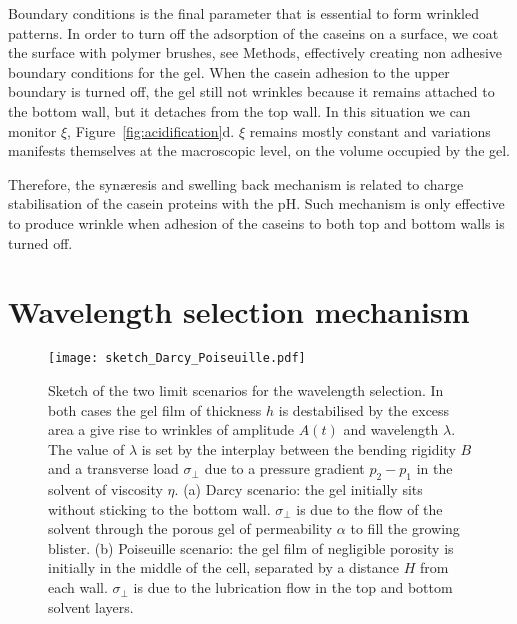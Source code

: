 \documentclass[twocolumn,superscriptaddress,showpacs,preprintnumbers,
amsmath,amssymb,prl]{revtex4-1}
\begin{document}
Boundary conditions is the final parameter that is essential to form wrinkled patterns. In order to turn off the adsorption of the caseins on a surface, we coat the surface with polymer brushes, see Methods, effectively creating non adhesive boundary conditions for the gel. When the casein adhesion to the upper boundary is turned off, the gel still not wrinkles because it remains attached to the bottom wall, but it detaches from the top wall. In this situation we can monitor $\xi$, Figure~\ref{fig:acidification}d. $\xi$ remains mostly constant and variations manifests themselves at the macroscopic level, on the volume occupied by the gel.

Therefore, the syn\ae{}resis and swelling back mechanism is related to charge stabilisation of the casein proteins with the pH. Such mechanism is only effective to produce wrinkle when adhesion of the caseins to both top and bottom walls is turned off.







\section*{Wavelength selection mechanism}

\begin{figure}
\texttt{[image: sketch\_Darcy\_Poiseuille.pdf]}
\caption{Sketch of the two limit scenarios for the wavelength selection. In both cases the gel film of thickness $h$ is destabilised by the excess area a give rise to wrinkles of amplitude $A(t)$ and wavelength $\lambda$. The value of $\lambda$ is set by the interplay between the bending rigidity $B$ and a transverse load $\sigma_\perp$ due to a pressure gradient $p_2-p_1$ in the solvent of viscosity $\eta$. (a) Darcy scenario: the gel initially sits without sticking to the bottom wall. $\sigma_\perp$ is due to the flow of the solvent through the porous gel of permeability $\alpha$ to fill the growing blister. (b) Poiseuille scenario: the gel film of negligible porosity is initially in the middle of the cell, separated by a distance $H$ from each wall. $\sigma_\perp$ is due to the lubrication flow in the top and bottom solvent layers.}
\label{fig:sketchDP}
\end{figure}

\end{document}
